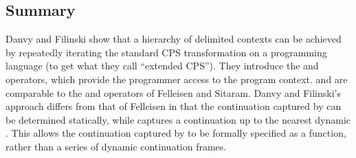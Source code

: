 \documentclass[letterpaper]{llncs}
\begin{document}
%
%
%

\subsection*{Summary}

Danvy and Filinski show that a hierarchy of delimited contexts can be achieved by repeatedly iterating the standard CPS transformation on a programming language (to get what they call ``extended CPS''). They introduce the \shiftfn and \resetfn operators, which provide the programmer access to the program context. \shiftfn and \resetfn are comparable to the \ctrl and \prompt operators of Felleisen and Sitaram. Danvy and Filinski's approach differs from that of Felleisen in that the continuation captured by \shiftfn can be determined statically, while \ctrl captures a continuation up to the nearest dynamic \prompt. This allows the continuation captured by \shiftfn to be formally specified as a function, rather than a series of dynamic continuation frames.
\end{document}
